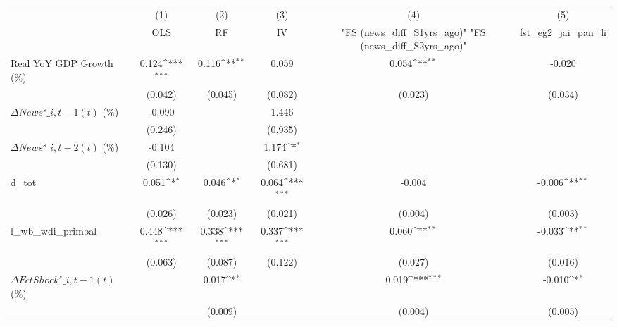 {
\def\sym#1{\ifmmode^{#1}\else\(^{#1}\)\fi}
\begin{tabular}{l*{5}{c}}
\toprule
                    &\multicolumn{1}{c}{(1)}&\multicolumn{1}{c}{(2)}&\multicolumn{1}{c}{(3)}&\multicolumn{1}{c}{(4)}&\multicolumn{1}{c}{(5)}\\
                    &\multicolumn{1}{c}{OLS}&\multicolumn{1}{c}{RF}&\multicolumn{1}{c}{IV}&\multicolumn{1}{c}{ "FS (news\_diff\_S1yrs\_ago)"  "FS (news\_diff\_S2yrs\_ago)" }&\multicolumn{1}{c}{fst\_eg2\_jai\_pan\_li}\\
\midrule
Real YoY GDP Growth (\%)&       0.124\sym{***}&       0.116\sym{**} &       0.059         &       0.054\sym{**} &      -0.020         \\
                    &     (0.042)         &     (0.045)         &     (0.082)         &     (0.023)         &     (0.034)         \\
\addlinespace
$ \Delta News^s\_{i,t-1}(t)$ (\%)&      -0.090         &                     &       1.446         &                     &                     \\
                    &     (0.246)         &                     &     (0.935)         &                     &                     \\
\addlinespace
$ \Delta News^s\_{i,t-2}(t)$ (\%)&      -0.104         &                     &       1.174\sym{*}  &                     &                     \\
                    &     (0.130)         &                     &     (0.681)         &                     &                     \\
\addlinespace
d\_tot               &       0.051\sym{*}  &       0.046\sym{*}  &       0.064\sym{***}&      -0.004         &      -0.006\sym{**} \\
                    &     (0.026)         &     (0.023)         &     (0.021)         &     (0.004)         &     (0.003)         \\
\addlinespace
l\_wb\_wdi\_primbal    &       0.448\sym{***}&       0.338\sym{***}&       0.337\sym{***}&       0.060\sym{**} &      -0.033\sym{**} \\
                    &     (0.063)         &     (0.087)         &     (0.122)         &     (0.027)         &     (0.016)         \\
\addlinespace
$ \Delta FctShock^s\_{i,t-1}(t)$ (\%)&                     &       0.017\sym{*}  &                     &       0.019\sym{***}&      -0.010\sym{*}  \\
                    &                     &     (0.009)         &                     &     (0.004)         &     (0.005)         \\

\end{tabular}}
